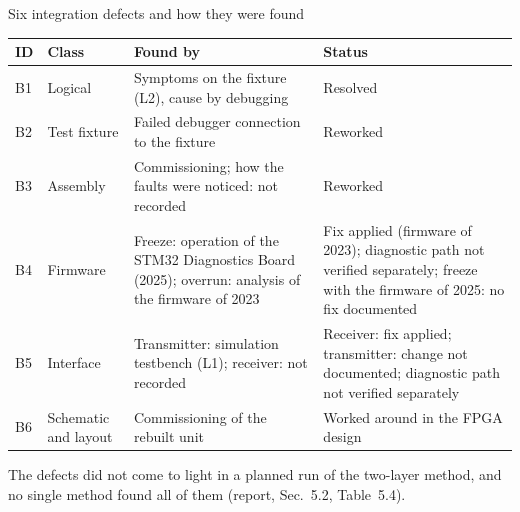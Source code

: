 \begin{frame}{Six integration defects and how they were found}
  \centering\scriptsize
  \begin{tabular}{@{}l l >{\raggedright\arraybackslash}p{4.2cm} >{\raggedright\arraybackslash}p{4.4cm}@{}}
    \toprule
    \textbf{ID} & \textbf{Class} & \textbf{Found by} & \textbf{Status} \\
    \midrule
    B1 & Logical      & Symptoms on the fixture (L2), cause by debugging & Resolved \\
    B2 & Test fixture & Failed debugger connection to the fixture & Reworked \\
    B3 & Assembly     & Commissioning; how the faults were noticed: not recorded & Reworked \\
    B4 & Firmware     & Freeze: operation of the STM32 Diagnostics Board (2025); overrun: analysis of the firmware of 2023 & Fix applied (firmware of 2023); diagnostic path not verified separately; freeze with the firmware of 2025: no fix documented \\
    B5 & Interface    & Transmitter: simulation testbench (L1); receiver: not recorded & Receiver: fix applied; transmitter: change not documented; diagnostic path not verified separately \\
    B6 & Schematic and layout & Commissioning of the rebuilt unit & Worked around in the FPGA design \\
    \bottomrule
  \end{tabular}
  \par\medskip
  \footnotesize The defects did not come to light in a planned run of the two-layer method, and no single method found all of them (report, Sec.~5.2, Table~5.4).
\end{frame}

